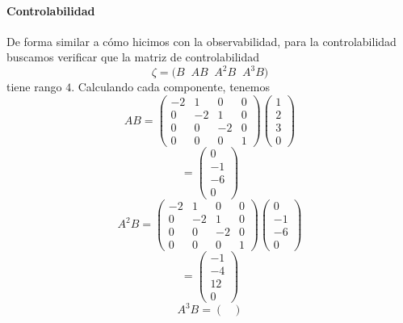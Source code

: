 \documentclass[
  11pt,
  letterpaper,
   addpoints,
   answers
  ]{exam}
\begin{document}
\begin{questions}
\begin{solution}
\paragraph*{Controlabilidad}
De forma similar a cómo hicimos con la observabilidad, para la controlabilidad
buscamos verificar que la matriz de controlabilidad
\begin{equation}
\zeta=\big(B\;\;AB\;\;A^{2}B\;\;A^{3}B\big)
\end{equation}
tiene rango $4$. Calculando cada componente, tenemos
\begin{equation}
AB=
\begin{pmatrix}
-2&1&0&0\\
0&-2&1&0\\
0&0&-2&0\\
0&0&0&1
\end{pmatrix}
\begin{pmatrix}
1\\2\\3\\0
\end{pmatrix}
\end{equation}
\begin{equation}
=
\begin{pmatrix}
0\\ -1\\ -6\\ 0
\end{pmatrix}
\end{equation}
\begin{equation}
A^{2}B=
\begin{pmatrix}
-2&1&0&0\\
0&-2&1&0\\
0&0&-2&0\\
0&0&0&1
\end{pmatrix}
\begin{pmatrix}
0\\ -1\\ -6\\ 0
\end{pmatrix}
\end{equation}
\begin{equation}
=
\begin{pmatrix}
-1\\ -4\\ 12\\ 0
\end{pmatrix}
\end{equation}
\begin{equation}
A^{3}B=
\begin{pmatrix}

\end{pmatrix}
\end{equation}
\end{solution}
\end{questions}
\end{document}
